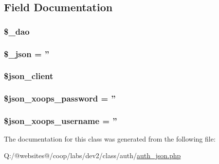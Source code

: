 \subsection{Field Documentation}
\hypertarget{class_xortify_auth_json_a12a029c610f699b4b25e79a1f64a3485}{
\subsubsection[{\$\-\_\-dao}]{\setlength{\rightskip}{0pt plus 5cm}\$\-\_\-dao}}\label{class_xortify_auth_json_a12a029c610f699b4b25e79a1f64a3485}
\hypertarget{class_xortify_auth_json_a94787b37d92a2dee02534eed4f316589}{
\subsubsection[{\$\-\_\-json}]{\setlength{\rightskip}{0pt plus 5cm}\$\-\_\-json = ''}}\label{class_xortify_auth_json_a94787b37d92a2dee02534eed4f316589}
\hypertarget{class_xortify_auth_json_a2d091f9d959cab9ac28ad2cc96149447}{
\subsubsection[{\$json\-\_\-client}]{\setlength{\rightskip}{0pt plus 5cm}\$json\-\_\-client}}\label{class_xortify_auth_json_a2d091f9d959cab9ac28ad2cc96149447}
\hypertarget{class_xortify_auth_json_a7af311f07c1c09254920e6ac0cefe9a9}{
\subsubsection[{\$json\-\_\-xoops\-\_\-password}]{\setlength{\rightskip}{0pt plus 5cm}\$json\-\_\-xoops\-\_\-password = ''}}\label{class_xortify_auth_json_a7af311f07c1c09254920e6ac0cefe9a9}
\hypertarget{class_xortify_auth_json_ac058687d82a56fb93513e7e58c4ec391}{
\subsubsection[{\$json\-\_\-xoops\-\_\-username}]{\setlength{\rightskip}{0pt plus 5cm}\$json\-\_\-xoops\-\_\-username = ''}}\label{class_xortify_auth_json_ac058687d82a56fb93513e7e58c4ec391}


The documentation for this class was generated from the following file\-:\begin{DoxyCompactItemize}
\item 
Q\-:/@websites@/coop/labs/dev2/class/auth/\hyperlink{auth__json_8php}{auth\-\_\-json.\-php}\end{DoxyCompactItemize}

